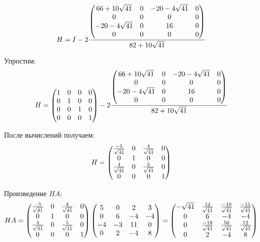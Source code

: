 \documentclass[a4paper,14pt]{article}
\begin{document}
$$
H = I - 2{{\begin{pmatrix}
            66 + 10\sqrt{41} & 0 & -20 - 4\sqrt{41} & 0 \\
            0                & 0 & 0                & 0 \\
            -20 - 4\sqrt{41} & 0 & 16               & 0 \\
            0                & 0 & 0                & 0
        \end{pmatrix}}\over{82+10\sqrt{41}}}
$$

Упростим:
$$
H =     \begin{pmatrix}
            1 & 0 & 0 & 0 \\
            0 & 1 & 0 & 0 \\
            0 & 0 & 1 & 0 \\
            0 & 0 & 0 & 1
        \end{pmatrix}
        - 2 {\begin{pmatrix}
                66 + 10\sqrt{41} & 0 & -20 - 4\sqrt{41} & 0 \\
                0                & 0 & 0                & 0 \\
                -20 - 4\sqrt{41} & 0 & 16               & 0 \\
                0                & 0 & 0                & 0
            \end{pmatrix}\over{82+10\sqrt{41}}}
$$

После вычислений получаем:
$$
H =     \begin{pmatrix}
            -{5}\over{\sqrt{41}} & 0 & {4}\over{\sqrt{41}} & 0 \\
            0 & 1 & 0 & 0 \\
            {4}\over{\sqrt{41}} & 0 & {5}\over{\sqrt{41}} & 0 \\
            0 & 0 & 0 & 1
        \end{pmatrix}
$$

Произведение $HA$:
$$
HA = \begin{pmatrix}
        -{5}\over{\sqrt{41}} & 0 & {4}\over{\sqrt{41}} & 0 \\
        0 & 1 & 0 & 0 \\
        {4}\over{\sqrt{41}} & 0 & {5}\over{\sqrt{41}} & 0 \\
        0 & 0 & 0 & 1
    \end{pmatrix}
    \begin{pmatrix}
        5 & 0 & 2 & 3 \\
        0 & 6 & -4 & -4 \\
        -4 & -3 & 11 & 0 \\
        0 & 2 & -4 & 8
    \end{pmatrix} = 
    \begin{pmatrix}
        -\sqrt{41} & {12}\over{\sqrt{41}} & -{10}\over{\sqrt{41}} & -{15}\over{\sqrt{41}} \\
        0 & 6 & -4 & -4 \\
        0 & -{18}\over{\sqrt{41}} & {50}\over{\sqrt{41}} & {12}\over{\sqrt{41}} \\
        0 & 2 & -4 & 8
    \end{pmatrix}
$$
\end{document}
